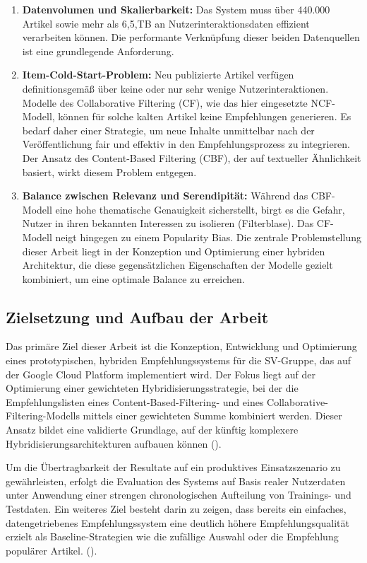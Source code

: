 \begin{enumerate}
    \item \textbf{Datenvolumen und Skalierbarkeit:} Das System muss über 440.000 Artikel sowie mehr als 6,5,TB an Nutzerinteraktionsdaten effizient verarbeiten können. Die performante Verknüpfung dieser beiden Datenquellen ist eine grundlegende Anforderung.
    
    \item \textbf{Item-Cold-Start-Problem:} Neu publizierte Artikel verfügen definitionsgemäß über keine oder nur sehr wenige Nutzerinteraktionen. Modelle des Collaborative Filtering (CF), wie das hier eingesetzte NCF-Modell, können für solche kalten Artikel keine Empfehlungen generieren. Es bedarf daher einer Strategie, um neue Inhalte unmittelbar nach der Veröffentlichung fair und effektiv in den Empfehlungsprozess zu integrieren. Der Ansatz des Content-Based Filtering (CBF), der auf textueller Ähnlichkeit basiert, wirkt diesem Problem entgegen.
    
    \item \textbf{Balance zwischen Relevanz und Serendipität:} Während das CBF-Modell eine hohe thematische Genauigkeit sicherstellt, birgt es die Gefahr, Nutzer in ihren bekannten Interessen zu isolieren (Filterblase). Das CF-Modell neigt hingegen zu einem Popularity Bias. Die zentrale Problemstellung dieser Arbeit liegt in der Konzeption und Optimierung einer hybriden Architektur, die diese gegensätzlichen Eigenschaften der Modelle gezielt kombiniert, um eine optimale Balance zu erreichen.
\end{enumerate}

\subsection{Zielsetzung und Aufbau der Arbeit}
\label{sec:zielsetzung}
Das primäre Ziel dieser Arbeit ist die Konzeption, Entwicklung und Optimierung eines prototypischen, 
hybriden Empfehlungssystems für die SV-Gruppe, das auf der Google Cloud Platform implementiert wird. 
Der Fokus liegt auf der Optimierung einer gewichteten Hybridisierungsstrategie, bei der die Empfehlungslisten 
eines Content-Based-Filtering- und eines Collaborative-Filtering-Modells mittels einer gewichteten Summe 
kombiniert werden. Dieser Ansatz bildet eine validierte Grundlage, auf der künftig komplexere 
Hybridisierungsarchitekturen aufbauen können (\cite{burke_hybrid_2002}).

Um die Übertragbarkeit der Resultate auf ein produktives Einsatzszenario zu gewährleisten, 
erfolgt die Evaluation des Systems auf Basis realer Nutzerdaten unter Anwendung einer strengen 
chronologischen Aufteilung von Trainings- und Testdaten. Ein weiteres Ziel besteht darin zu zeigen, 
dass bereits ein einfaches, datengetriebenes Empfehlungssystem eine deutlich höhere 
Empfehlungsqualität erzielt als Baseline-Strategien wie die zufällige 
Auswahl oder die Empfehlung populärer Artikel. (\cite{jannach_survey_2023}).

